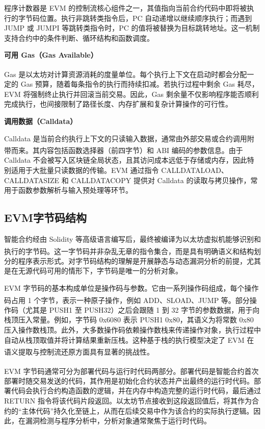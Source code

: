 \documentclass[print, master, vlined, timesmath]{DissertUESTC}
\begin{document}
程序计数器是 EVM 的控制流核心组件之一，其值指向当前合约代码中即将被执行的字节码位置。执行非跳转类指令后，PC 自动递增以继续顺序执行；而遇到 JUMP 或 JUMPI 等跳转类指令时，PC 的值将被替换为目标跳转地址。这一机制支持合约中的条件判断、循环结构和函数调度。

\textbf{可用 Gas（Gas Available）}

Gas 是以太坊对计算资源消耗的度量单位\textsuperscript{\cite{...}}。每个执行上下文在启动时都会分配一定的 Gas 预算，随着每条指令的执行而持续扣减。若执行过程中剩余 Gas 耗尽，EVM 将强制终止执行并回滚当前交易。因此，Gas 剩余量不仅影响程序能否顺利完成执行，也间接限制了路径长度、内存扩展和复杂计算操作的可行性。

\textbf{调用数据（Calldata）}

Calldata 是当前合约执行上下文的只读输入数据，通常由外部交易或合约调用附带而来\textsuperscript{\cite{...}}。其内容包括函数选择器（前四字节）和 ABI 编码的参数信息\textsuperscript{\cite{...}}。由于 Calldata 不会被写入区块链全局状态，且其访问成本远低于存储或内存，因此特别适用于大批量只读数据的传输。EVM 通过指令 CALLDATALOAD、CALLDATASIZE 和 CALLDATACOPY 提供对 Calldata 的读取与拷贝操作，常用于函数参数解析与输入预处理等环节。


\subsection{EVM字节码结构}

智能合约经由 Solidity 等高级语言编写后，最终被编译为以太坊虚拟机能够识别和执行的字节码\textsuperscript{\cite{...}}。这一字节码并非杂乱无章的指令集合，而是具有明确语义和结构划分的程序表示形式。对字节码结构的理解是开展静态与动态漏洞分析的前提，尤其是在无源代码可用的情形下，字节码是唯一的分析对象。

EVM 字节码的基本构成单位是操作码与参数。它由一系列操作码组成，每个操作码占用 1 个字节，表示一种原子操作，例如 ADD、SLOAD、JUMP 等\textsuperscript{\cite{...}}。部分操作码（尤其是 PUSH1 至 PUSH32）之后会跟随 1 到 32 字节的参数数据，用于向栈顶压入常量。例如，字节码 0x6080 表示 PUSH1 0x80，其语义为将常数 0x80 压入操作数栈顶。此外，大多数操作码依赖操作数栈来传递操作对象，执行过程中自动从栈顶取值并将计算结果重新压栈。这种基于栈的执行模型决定了 EVM 在语义提取与控制流还原方面具有显著的挑战性\textsuperscript{\cite{...}}。

EVM 字节码通常可分为部署代码与运行时代码两部分\textsuperscript{\cite{...}}。部署代码是智能合约首次部署时随交易发送的代码，其作用是初始化合约状态并产出最终的运行时代码。部署代码会执行合约构造函数的逻辑，并在内存中构造完整的运行时代码，最后通过 RETURN 指令将该代码片段返回。以太坊节点接收到这段返回值后，将其作为合约的“主体代码”持久化至链上，从而在后续交易中作为该合约的实际执行逻辑。因此，在漏洞检测与程序分析中，分析对象通常聚焦于运行时代码。
\end{document}
